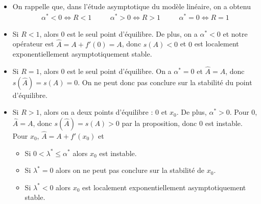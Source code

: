 \begin{frame}
    \begin{itemize}
        \item On rappelle que, dans l'étude asymptotique du modèle linéaire, on a obtenu
        \begin{align*}
            \alpha^* < 0 \iff R < 1 & \quad & \alpha^* > 0 \iff R > 1 & \quad & \alpha^*=0 \iff R=1
        \end{align*} \pause
        \item Si $R<1$, alors $0$ est le seul point d'équilibre. De plus, on a $\alpha^*<0$ et notre opérateur est $\hat{A}=A+f'(0)=A$, donc $s(A) <0$ et $0$ est localement exponentiellement asymptotiquement stable. \pause
        \item Si $R=1$, alors $0$ est le seul point d'équilibre. On a $\alpha^*=0$ et $\hat{A}=A$, donc $s(\hat{A})=s(A) =0$. On ne peut donc pas conclure sur la stabilité du point d'équilibre.
        \item Si $R>1$, alors on a deux points d'équilibre : $0$ et $x_0$. De plus, $\alpha^*>0$. Pour $0$, $\hat{A}=A$, donc $s(\hat{A})=s(A) >0$ par la proposition, donc $0$ est instable. \pause Pour $x_0$, $\hat{A}=A+f'(x_0)$ et
        \begin{itemize}
            \item[$\triangleright$] Si $0 < \lambda^* \leq \alpha^*$ alors $x_0$ est instable.
            \item[$\triangleright$] Si $\lambda^*=0$ alors on ne peut pas conclure sur la stabilité de $x_0$.
            \item[$\triangleright$] Si $\lambda^* < 0$ alors $x_0$ est localement exponentiellement asymptotiquement stable.
        \end{itemize}
    \end{itemize}
\end{frame}